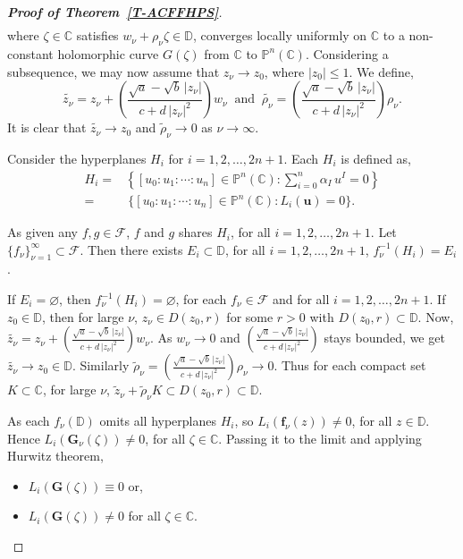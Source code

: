 \documentclass[10pt,a4paper]{amsart}
\begin{document}
\begin{proof}[{\bf Proof of Theorem~\ref{T-ACFFHPS}}]
\begin{align*}
\end{align*}
where $\zeta\in\mathbb C$ satisfies $w_{\nu}+\rho_{\nu}\zeta\in\mathbb D$, converges locally 
uniformly on $\mathbb C$ to a non-constant holomorphic curve $G(\zeta)$ from $\mathbb C$ to $\mathbb P^n(\mathbb C)$. 
Considering a subsequence, we may now assume that $z_{\nu}\to z_0$, where $|z_0|\leq 1$. We define,
$$\widetilde{z_{\nu}}=z_{\nu}+\left(\frac{\sqrt{a}-\sqrt{b}\,|z_{\nu}|}{c+d\,|z_{\nu}|^2}\right)w_{\nu}\ \text{ and }\ \widetilde{\rho_{\nu}}=\left(\frac{\sqrt{a}-\sqrt{b}\,|z_{\nu}|}{c+d\,|z_{\nu}|^2}\right)\rho_{\nu}.$$ 
It is clear that $\widetilde{z_{\nu}}\to z_0$ and $\widetilde\rho_{\nu}\to 0$ as $\nu\to\infty$.\smallskip

Consider the hyperplanes $H_i$ for $i=1,2,\dots,2n+1$. Each $H_i$ is defined as,
\begin{align*}H_i=&\left\{[u_0:u_1:\cdots:u_n]\in\mathbb P^n(\mathbb C):\sum_{i=0}^n \alpha_I\,u^I=0\right\}\\ =&~\{[u_0:u_1:\cdots:u_n]\in\mathbb P^n(\mathbb C):L_i(\mathbf u)=0\}.\end{align*}

As given any $f,g\in \mathcal F$, $f$ and $g$ shares $H_i$, for all $i=1,2,\dots,2n+1$. Let 
$\{f_{\nu}\}_{\nu=1}^{\infty}\subset\mathcal F$. Then there exists $E_i\subset \mathbb D$, 
for all $i=1,2,\dots,2n+1$, $f_{\nu}^{-1}(H_i)=E_i$. \smallskip

If $E_i=\varnothing$, then $f_{\nu}^{-1}(H_i)=\varnothing$, for each $f_{\nu}\in\mathcal F$ and for all $i=1,2,\dots,2n+1$. If 
$z_0\in\mathbb D$, then for large $\nu$, $z_{\nu}\in D(z_0,r)$ for some $r>0$ with $D(z_0,r)\subset\mathbb D$. Now, 
$\widetilde{z_{\nu}}=z_{\nu}+\left(\frac{\sqrt{a}-\sqrt{b}\,|z_{\nu}|}{c+d\,|z_{\nu}|^2}\right)w_{\nu}$. As 
$w_{\nu}\to 0$ and $\left(\frac{\sqrt{a}-\sqrt{b}\,|z_{\nu}|}{c+d\,|z_{\nu}|^2}\right)$ stays bounded, we get 
$\widetilde{z_{\nu}}\to z_0\in\mathbb D$. Similarly $\widetilde \rho_{\nu}=\left(\frac{\sqrt{a}-\sqrt{b}\,|z_{\nu}|}{c+d\,|z_{\nu}|^2}\right)\rho_{\nu}\to 0$. 
Thus for each compact set $K\subset\mathbb C$, for large $\nu$, $\widetilde z_{\nu} +\widetilde \rho_{\nu} K\subset D(z_0,r)\subset \mathbb D$. \smallskip

As each $f_{\nu}(\mathbb D)$ omits all hyperplanes $H_i$, so $L_i(\mathbf{f}_{\nu}(z))\neq 0$, for all $z\in\mathbb D$. Hence
$L_i(\mathbf{G}_{\nu}(\zeta))\neq 0$, for all $\zeta\in\mathbb C$. Passing it to the limit and applying Hurwitz theorem,
\begin{itemize}
    \item $L_i(\mathbf{G}(\zeta))\equiv 0$ or,
    \item $L_i(\mathbf{G}(\zeta))\neq 0$ for all $\zeta\in\mathbb C$.
\end{itemize}



\end{proof}
\end{document}
